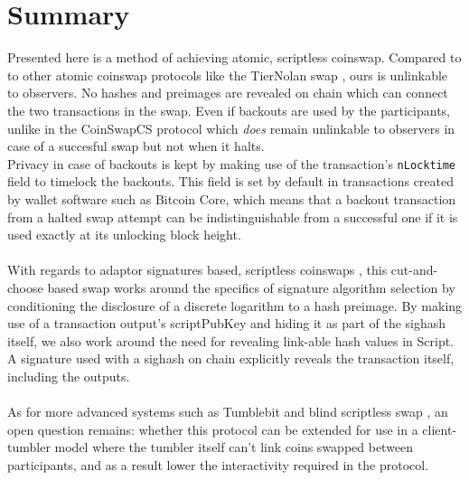 \documentclass[12pt,a4paper]{article}
\begin{document}
\section{Summary}
Presented here is a method of achieving atomic, scriptless coinswap.  Compared to to other atomic coinswap protocols like the TierNolan swap \cite{tiernolan}, ours is unlinkable to observers. No hashes and preimages are revealed on chain which can connect the two transactions in the swap.  Even if backouts are used by the participants, unlike in the CoinSwapCS \cite{coinswapcs} protocol which \textit{does} remain unlinkable to observers in case of a succesful swap but not when it halts.
\\
Privacy in case of backouts is kept by making use of the transaction's \texttt{nLocktime} field to timelock the backouts.  This field is set by default in transactions created by wallet software such as Bitcoin Core, which means that a backout transaction from a halted swap attempt can be indistinguishable from a successful one if it is used exactly at its unlocking block height.
\\ \\
With regards to adaptor signatures based, scriptless coinswaps \cite{andytoshi}, this cut-and-choose based swap works around the specifics of signature algorithm selection by conditioning the disclosure of a discrete logarithm to a hash preimage.  By making use of a transaction output's scriptPubKey and hiding it as part of the sighash itself, we also work around the need for revealing link-able hash values in Script. A signature used with a sighash on chain explicitly reveals the transaction itself, including the outputs.
\\ \\
As for more advanced systems such as Tumblebit \cite{tumblebit} and blind scriptless swap \cite{nickler}, an open question remains: whether this protocol can be extended for use in a client-tumbler model where the tumbler itself can't link coins swapped between participants, and as a result lower the interactivity required in the protocol.
\end{document}
